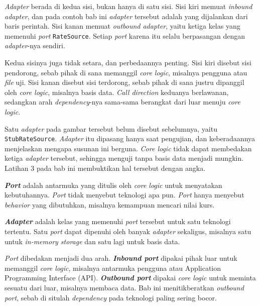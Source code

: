 \textit{Adapter} berada di kedua sisi, bukan hanya di satu sisi. Sisi kiri
memuat \textit{inbound adapter}, dan
pada contoh bab ini \textit{adapter}
tersebut adalah  yang dijalankan dari
baris perintah. Sisi kanan memuat \textit{outbound
adapter}, yaitu ketiga kelas
yang memenuhi \textit{port} \texttt{RateSource}. Setiap \textit{port} karena
itu selalu berpasangan dengan \textit{adapter}-nya sendiri.

Kedua sisinya juga tidak setara, dan perbedaannya penting. Sisi kiri disebut
sisi pendorong, sebab pihak di sana memanggil \textit{core logic}, misalnya
pengguna atau \textit{file} uji. Sisi kanan disebut sisi terdorong, sebab pihak
di sana justru dipanggil oleh \textit{core logic}, misalnya basis data.
\textit{Call direction} keduanya berlawanan, sedangkan arah
\textit{dependency}-nya sama-sama berangkat dari luar menuju \textit{core
logic}.

Satu \textit{adapter} pada gambar tersebut belum disebut sebelumnya, yaitu
\texttt{StubRateSource}. \textit{Adapter} itu dipasang hanya saat pengujian, dan
keberadaannya menjelaskan mengapa susunan ini berguna. \textit{Core logic}
tidak dapat membedakan ketiga \textit{adapter} tersebut, sehingga menguji tanpa
basis data menjadi mungkin. Latihan 3 pada bab ini membuktikan hal tersebut
dengan angka.

\textbf{\textit{Port}} adalah antarmuka yang ditulis oleh \textit{core logic}
untuk menyatakan kebutuhannya. \textit{Port} tidak menyebut teknologi apa pun.
\textit{Port} hanya menyebut \textit{behavior} yang dibutuhkan, misalnya
kemampuan mencari nilai kurs.

\textbf{\textit{Adapter}} adalah kelas yang memenuhi \textit{port} tersebut
untuk satu teknologi tertentu. Satu \textit{port} dapat dipenuhi oleh banyak
\textit{adapter} sekaligus, misalnya satu untuk \textit{in-memory storage} dan
satu lagi untuk basis data.

\textit{Port} dibedakan menjadi dua arah. \textbf{\textit{Inbound
port}}
dipakai pihak luar untuk memanggil \textit{core logic}, misalnya antarmuka
pengguna atau Application Programming Interface (API). \textbf{\textit{Outbound
port}} dipakai \textit{core logic} untuk
meminta sesuatu dari luar, misalnya
membaca data. Bab ini menitikberatkan \textit{outbound port}, sebab di situlah
\textit{dependency} pada teknologi paling sering bocor.

